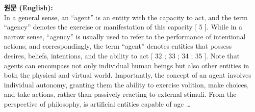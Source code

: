\documentclass[12pt,a4paper]{article}
\begin{document}
\begin{mdframed}[style=orig]
\noindent\textbf{\small 원문 (English):}\\[2pt]
\small In a general sense, an “agent” is an entity with the capacity to act, and the term “agency” denotes the exercise or manifestation of this capacity [ 5 ]. While in a narrow sense, “agency” is usually used to refer to the performance of intentional actions; and correspondingly, the term “agent” denotes entities that possess desires, beliefs, intentions, and the ability to act [ 32 ; 33 ; 34 ; 35 ]. Note that agents can encompass not only individual human beings but also other entities in both the physical and virtual world. Importantly, the concept of an agent involves individual autonomy, granting them the ability to exercise volition, make choices, and take actions, rather than passively reacting to external stimuli. From the perspective of philosophy, is artificial entities capable of age \ldots
\end{mdframed}
\vspace{0.4em}
\end{document}
